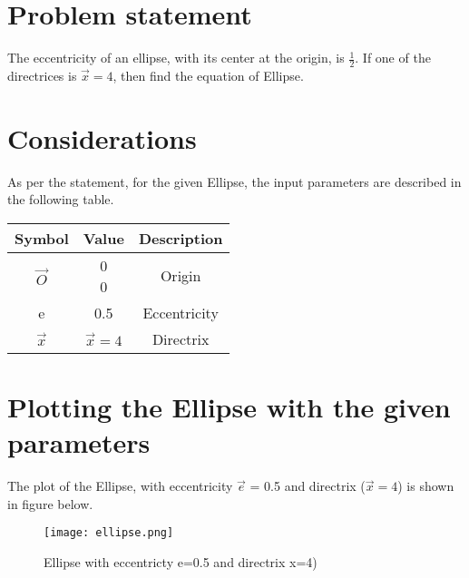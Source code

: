\documentclass[journal,10pt,twocolumn]{article}
\begin{document}
\section{Problem statement}
The eccentricity of an ellipse, with its center at the origin, is $\frac{1}{2}$. If one of the directrices is $\vec{x}=4$, then find the equation of Ellipse.
\section{Considerations}
\vspace{0.2cm}
As per the statement, for the given Ellipse, the input parameters are described in the following table. \\
\vspace{0.2cm}

\setlength\extrarowheight{2pt}
\begin{tabular}{|c|c|c|}
	\hline
	\textbf{Symbol}&\textbf{Value}&\textbf{Description}\\
	\hline
	$\vec{O}$ & \myvec{0\\0}
	&Origin\\
	\hline
	e & 0.5 & Eccentricity\\
	\hline
	$\vec{x}$ & $\vec{x}=4$
	&Directrix
	\\
\hline
\end{tabular}

\section{Plotting the Ellipse with the given parameters}
\vspace{0.25cm}
The plot of the Ellipse, with eccentricity $\vec{e}$ = 0.5 and directrix ($\vec{x}=4$) is shown in figure below.
\begin{figure}[h]
\texttt{[image: ellipse.png]}
\caption{Ellipse with eccentricty e=0.5 and directrix x=4)}
\label{fig:Ellipse}
\end{figure}
\end{document}
